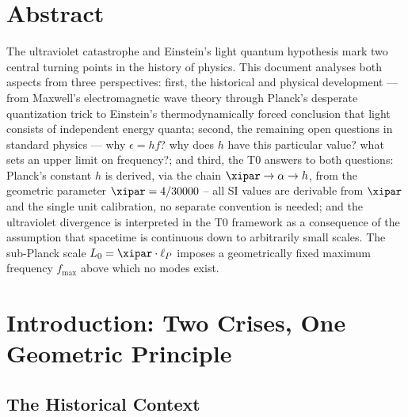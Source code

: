 
\section*{Abstract}

The ultraviolet catastrophe and Einstein's light quantum hypothesis mark two 
central turning points in the history of physics. This document 
analyses both aspects from three perspectives: first, the historical and physical 
development — from Maxwell's electromagnetic wave theory through Planck's desperate 
quantization trick to Einstein's thermodynamically forced conclusion that light consists 
of independent energy quanta; second, the remaining open questions in standard 
physics — why $\epsilon = hf$? why does $h$ have this particular value? what sets 
an upper limit on frequency?; and third, the T0 answers to both questions: Planck's 
constant $h$ is derived, via the chain $\xipar\to\alpha\to h$, from the geometric parameter 
$\xipar = 4/30000$ -- all SI values are derivable from $\xipar$ and the single unit calibration, no separate convention is needed; and the ultraviolet divergence is interpreted in the T0 framework 
as a consequence of the assumption that spacetime is continuous down to arbitrarily 
small scales. The sub-Planck scale $L_0 = \xipar \cdot \ell_P$ imposes a geometrically 
fixed maximum frequency $f_{\max}$ above which no modes exist.

\clearpage

\section{Introduction: Two Crises, One Geometric Principle}
\label{sec:intro}

\subsection{The Historical Context}


